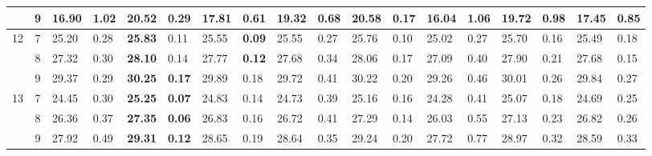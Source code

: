\documentclass[conference]{IEEEtran}
\begin{document}
\begin{table}[]
\begin{tabular}{|cc|ll|ll|ll|ll|ll|ll|ll|ll|}
		\multicolumn{1}{|c|}{} & 9 & \multicolumn{1}{l|}{16.90} & 1.02 & \multicolumn{1}{l|}{20.52} & 0.29 & \multicolumn{1}{l|}{17.81} & 0.61 & \multicolumn{1}{l|}{19.32} & 0.68 & \multicolumn{1}{l|}{\textbf{20.58}} & \textbf{0.17} & \multicolumn{1}{l|}{16.04} & 1.06 & \multicolumn{1}{l|}{19.72} & 0.98 & \multicolumn{1}{l|}{17.45} & 0.85 \\ \hline
		\multicolumn{1}{|c|}{\multirow{3}{*}{12}} & 7 & \multicolumn{1}{l|}{25.20} & 0.28 & \multicolumn{1}{l|}{\textbf{25.83}} & 0.11 & \multicolumn{1}{l|}{25.55} & \textbf{0.09} & \multicolumn{1}{l|}{25.55} & 0.27 & \multicolumn{1}{l|}{25.76} & 0.10 & \multicolumn{1}{l|}{25.02} & 0.27 & \multicolumn{1}{l|}{25.70} & 0.16 & \multicolumn{1}{l|}{25.49} & 0.18 \\ \cline{2-18} 
		\multicolumn{1}{|c|}{} & 8 & \multicolumn{1}{l|}{27.32} & 0.30 & \multicolumn{1}{l|}{\textbf{28.10}} & 0.14 & \multicolumn{1}{l|}{27.77} & \textbf{0.12} & \multicolumn{1}{l|}{27.68} & 0.34 & \multicolumn{1}{l|}{28.06} & 0.17 & \multicolumn{1}{l|}{27.09} & 0.40 & \multicolumn{1}{l|}{27.90} & 0.21 & \multicolumn{1}{l|}{27.68} & 0.15 \\ \cline{2-18} 
		\multicolumn{1}{|c|}{} & 9 & \multicolumn{1}{l|}{29.37} & 0.29 & \multicolumn{1}{l|}{\textbf{30.25}} & \textbf{0.17} & \multicolumn{1}{l|}{29.89} & 0.18 & \multicolumn{1}{l|}{29.72} & 0.41 & \multicolumn{1}{l|}{30.22} & 0.20 & \multicolumn{1}{l|}{29.26} & 0.46 & \multicolumn{1}{l|}{30.01} & 0.26 & \multicolumn{1}{l|}{29.84} & 0.27 \\ \hline
		\multicolumn{1}{|c|}{\multirow{3}{*}{13}} & 7 & \multicolumn{1}{l|}{24.45} & 0.30 & \multicolumn{1}{l|}{\textbf{25.25}} & \textbf{0.07} & \multicolumn{1}{l|}{24.83} & 0.14 & \multicolumn{1}{l|}{24.73} & 0.39 & \multicolumn{1}{l|}{25.16} & 0.16 & \multicolumn{1}{l|}{24.28} & 0.41 & \multicolumn{1}{l|}{25.07} & 0.18 & \multicolumn{1}{l|}{24.69} & 0.25 \\ \cline{2-18} 
		\multicolumn{1}{|c|}{} & 8 & \multicolumn{1}{l|}{26.36} & 0.37 & \multicolumn{1}{l|}{\textbf{27.35}} & \textbf{0.06} & \multicolumn{1}{l|}{26.83} & 0.16 & \multicolumn{1}{l|}{26.72} & 0.41 & \multicolumn{1}{l|}{27.29} & 0.14 & \multicolumn{1}{l|}{26.03} & 0.55 & \multicolumn{1}{l|}{27.13} & 0.23 & \multicolumn{1}{l|}{26.82} & 0.26 \\ \cline{2-18} 
		\multicolumn{1}{|c|}{} & 9 & \multicolumn{1}{l|}{27.92} & 0.49 & \multicolumn{1}{l|}{\textbf{29.31}} & \textbf{0.12} & \multicolumn{1}{l|}{28.65} & 0.19 & \multicolumn{1}{l|}{28.64} & 0.35 & \multicolumn{1}{l|}{29.24} & 0.20 & \multicolumn{1}{l|}{27.72} & 0.77 & \multicolumn{1}{l|}{28.97} & 0.32 & \multicolumn{1}{l|}{28.59} & 0.33 \\ \hline

\end{tabular}
\end{table}
\end{document}
